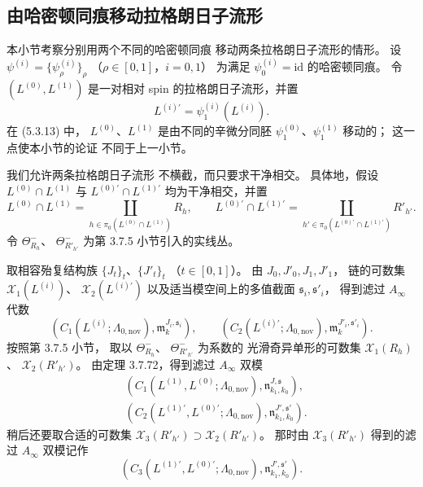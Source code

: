 
\subsection{由哈密顿同痕移动拉格朗日子流形}
\label{subsec:5-3-2}

本小节考察分别用两个不同的哈密顿同痕
移动两条拉格朗日子流形的情形。
设
$\psi^{(i)}=\{\psi^{(i)}_\rho\}_\rho$
（$\rho\in[0,1]$，$i=0,1$）
为满足 $\psi^{(i)}_0=\mathrm{id}$
的哈密顿同痕。
令 $(L^{(0)},L^{(1)})$
是一对相对 spin 的拉格朗日子流形，并置
\begin{equation}
L^{(i)\prime}=\psi^{(i)}_1(L^{(i)}).
\tag{5.3.13}\label{eq:5-3-13}
\end{equation}
在 (5.3.13) 中，
$L^{(0)}$、$L^{(1)}$
是由不同的辛微分同胚
$\psi^{(0)}_1$、$\psi^{(1)}_1$
移动的；
这一点使本小节的论证
不同于上一小节。

我们允许两条拉格朗日子流形
不横截，而只要求干净相交。
具体地，假设
$L^{(0)}\cap L^{(1)}$ 与
$L^{(0)\prime}\cap L^{(1)\prime}$
均为干净相交，并置
\[
L^{(0)}\cap L^{(1)}
=\coprod_{h\in\pi_0(L^{(0)}\cap L^{(1)})}R_h,
\qquad
L^{(0)\prime}\cap L^{(1)\prime}
=\coprod_{h'\in\pi_0(L^{(0)\prime}\cap L^{(1)\prime})}R'_{h'}.
\]
令 $\Theta^-_{R_h}$、
$\Theta^-_{R'_{h'}}$
为第 3.7.5 小节引入的实线丛。

取相容殆复结构族
$\{J_t\}_t$、$\{J'_t\}_t$
（$t\in[0,1]$）。
由 $J_0,J'_0,J_1,J'_1$，
链的可数集
$\mathcal X_1(L^{(i)})$、
$\mathcal X_2(L^{(i)\prime})$
以及适当模空间上的多值截面
$\mathfrak s_i,\mathfrak s'_i$，
得到滤过 $A_\infty$ 代数
\[
(C_1(L^{(i)};\Lambda_{0,\mathrm{nov}}),
 \mathfrak m_k^{J_i,\mathfrak s_i}),
\qquad
(C_2(L^{(i)\prime};\Lambda_{0,\mathrm{nov}}),
 \mathfrak m_k^{J'_i,\mathfrak s'_i}).
\]
按照第 3.7.5 小节，
取以 $\Theta^-_{R_h}$、
$\Theta^-_{R'_{h'}}$ 为系数的
光滑奇异单形的可数集
$\mathcal X_1(R_h)$、
$\mathcal X_2(R'_{h'})$。
由定理 3.7.72，得到滤过
$A_\infty$ 双模
\[
\begin{aligned}
&(C_1(L^{(1)},L^{(0)};
 \Lambda_{0,\mathrm{nov}}),
 \mathfrak n_{k_1,k_0}^{J,\mathfrak s}),
\\
&(C_2(L^{(1)\prime},L^{(0)\prime};
 \Lambda_{0,\mathrm{nov}}),
 \mathfrak n_{k_1,k_0}^{J',\mathfrak s'}).
\end{aligned}
\]
稍后还要取合适的可数集
$\mathcal X_3(R'_{h'})
\supset\mathcal X_2(R'_{h'})$。
那时由 $\mathcal X_3(R'_{h'})$
得到的滤过 $A_\infty$ 双模记作
\[
(C_3(L^{(1)\prime},L^{(0)\prime};
 \Lambda_{0,\mathrm{nov}}),
 \mathfrak n_{k_1,k_0}^{J',\mathfrak s'}).
\]

